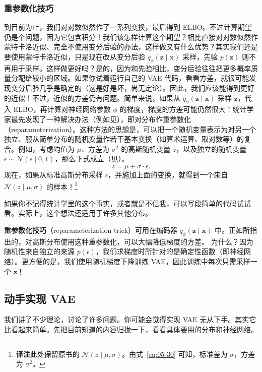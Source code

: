\subsubsection{重参数化技巧}
到目前为止，我们对对数似然作了一系列变换，最后得到 ELBO。不过计算期望仍是个问题，因为它包含积分！我们该怎样计算这个期望？相比直接对对数似然作蒙特卡洛近似、完全不使用变分后验的办法，这样做又有什么优势？其实我们还是要使用蒙特卡洛近似，只是现在改从变分后验 $q_\phi(\mathbf{z}\mid\mathbf{x})$ 采样，先验 $p(\mathbf{z})$ 则不再用于采样。这样做更好吗？是的，因为和先验相比，变分后验往往把更多概率质量分配给较小的区域。如果你试着运行自己的 VAE 代码，看看方差，就很可能发现变分后验几乎是确定的（这是好是坏，尚无定论）。因此，我们应该能得到更好的近似！不过，近似的方差仍有问题。简单来说，如果从 $q_\phi(\mathbf{z}\mid\mathbf{x})$ 采样 $\mathbf{z}$，代入 ELBO，再计算对神经网络参数 $\phi$ 的梯度，梯度的方差可能仍然很大！统计学家最先发现了一种解决办法（例如见），即对分布作重参数化（reparameterization）。这种方法的思想是，可以把一个随机变量表示为对另一个独立、服从简单分布的随机变量作若干基本变换（如算术运算、取对数等）的复合。例如，考虑均值为 $\mu$、方差为 $\sigma^2$ 的高斯随机变量 $z$，以及独立的随机变量 $\epsilon\sim\mathcal{N}(\epsilon\mid 0,1)$，那么下式成立（见）。
\begin{equation}
z=\mu+\sigma\cdot\epsilon.
\tag{5.30}\label{eq:05-30}
\end{equation}
现在，如果从标准高斯分布采样 $\epsilon$，并施加上面的变换，就得到一个来自 $\mathcal{N}(z\mid\mu,\sigma)$ 的样本！\footnote{\textbf{译注}\quad 此处保留原书的 $\mathcal{N}(z\mid\mu,\sigma)$。由式~\eqref{eq:05-30} 可知，标准差为 $\sigma$，方差为 $\sigma^2$。}

如果你不记得统计学里的这个事实，或者就是不信我，可以写段简单的代码试试看。实际上，这个想法还适用于许多其他分布。

\textbf{重参数化技巧}（reparameterization trick）可用在编码器 $q_\phi(\mathbf{z}\mid\mathbf{x})$ 中。正如所指出的，对高斯分布使用这种重参数化，可以大幅降低梯度的方差。
为什么？因为随机性来自独立的来源 $p(\epsilon)$，我们求梯度时所针对的是确定性函数（即神经网络）。更方便的是，我们使用随机梯度下降训练 VAE，因此训练中每次只需采样一个 $\mathbf{z}$！


\subsection{动手实现 VAE}
我们讲了不少理论，讨论了许多问题。你可能会觉得实现 VAE 无从下手。其实它比看起来简单。先把目前知道的内容归拢一下，看看具体要用的分布和神经网络。

